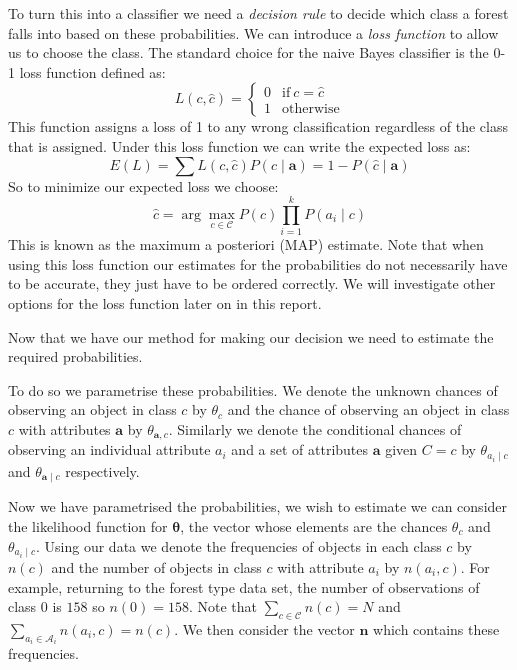 To turn this into a classifier we need a \textit{decision rule} to decide which class a forest falls into based on these probabilities.
We can introduce a \textit{loss function} to allow us to choose the class.
The standard choice for the naive Bayes classifier is the 0-1 loss function \cite{Rish01} defined as:
\begin{equation}\label{0-1_loss_function}
	L(c, \hat{c}) = 
	\begin{cases}
		0 & \text{if}\ c = \hat{c} \\
		1 & \text{otherwise}
	\end{cases}
\end{equation}
This function assigns a loss of 1 to any wrong classification regardless of the class that is assigned. 
Under this loss function we can write the expected loss as:
\begin{equation}
	E(L) = \sum L(c, \hat{c})P(c \mid \mathbf{a}) = 1 - P(\hat{c} \mid \mathbf{a})
\end{equation}
So to minimize our expected loss we choose:
\begin{equation} \label{map_estimate}
	\hat c = \arg\max_{c \in \mathcal{C}} P(c)\prod_{i=1}^{k}P(a_i \mid c)
\end{equation}
This is known as the maximum a posteriori (MAP) estimate.
Note that when using this loss function our estimates for the probabilities do not necessarily have to be accurate, they just have to be ordered correctly.
We will investigate other options for the loss function later on in this report.

Now that we have our method for making our decision we need to estimate the required probabilities.

To do so we parametrise these probabilities.
We denote the unknown chances of observing an object in class $c$ by $\theta_c$ and the chance of observing an object in class $c$ with attributes $\mathbf{a}$ by $\theta_{\mathbf{a}, c}$.
Similarly we denote the conditional chances of observing an individual attribute $a_i$ and a set of attributes $\mathbf{a}$ given $C=c$ by $\theta_{a_i \mid c}$ and $\theta_{\mathbf{a} \mid c}$ respectively.

Now we have parametrised the probabilities, we wish to estimate we can consider the likelihood function for $\mathbf{\theta}$, the vector whose elements are the chances $\theta_{c}$ and $\theta_{a_i \mid c}$.
Using our data we denote the frequencies of objects in each class $c$ by $n(c)$ and the number of objects in class $c$ with attribute $a_i$ by $n(a_i, c)$.
For example, returning to the forest type data set, the number of observations of class $0$ is $158$ so $n(0) = 158$.
Note that $\sum_{c \in \mathcal{C}}n(c) = N$ and $\sum_{a_i \in \mathcal{A}_i}n(a_i, c) = n(c)$.
We then consider the vector $\mathbf{n}$ which contains these frequencies.

